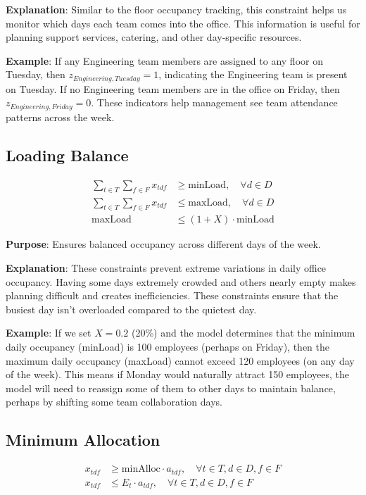 \documentclass[12pt,a4paper]{article}
\begin{document}
\textbf{Explanation}: Similar to the floor occupancy tracking, this constraint helps us monitor which days each team comes into the office. This information is useful for planning support services, catering, and other day-specific resources.

\textbf{Example}: If any Engineering team members are assigned to any floor on Tuesday, then $z_{Engineering,Tuesday} = 1$, indicating the Engineering team is present on Tuesday. If no Engineering team members are in the office on Friday, then $z_{Engineering,Friday} = 0$. These indicators help management see team attendance patterns across the week.

\subsection{Loading Balance}

\begin{align}
\sum_{t\in T} \sum_{f\in F} x_{tdf} &\geq \text{minLoad}, \quad \forall d \in D \\
\sum_{t\in T} \sum_{f\in F} x_{tdf} &\leq \text{maxLoad}, \quad \forall d \in D \\
\text{maxLoad} &\leq (1 + X) \cdot \text{minLoad}
\end{align}

\textbf{Purpose}: Ensures balanced occupancy across different days of the week.

\textbf{Explanation}: These constraints prevent extreme variations in daily office occupancy. Having some days extremely crowded and others nearly empty makes planning difficult and creates inefficiencies. These constraints ensure that the busiest day isn't overloaded compared to the quietest day.

\textbf{Example}: If we set $X = 0.2$ (20\%) and the model determines that the minimum daily occupancy (minLoad) is 100 employees (perhaps on Friday), then the maximum daily occupancy (maxLoad) cannot exceed 120 employees (on any day of the week). This means if Monday would naturally attract 150 employees, the model will need to reassign some of them to other days to maintain balance, perhaps by shifting some team collaboration days.

\subsection{Minimum Allocation}

\begin{align}
x_{tdf} &\geq \text{minAlloc} \cdot a_{tdf}, \quad \forall t \in T, d \in D, f \in F \\
x_{tdf} &\leq E_t \cdot a_{tdf}, \quad \forall t \in T, d \in D, f \in F
\end{align}
\end{document}
